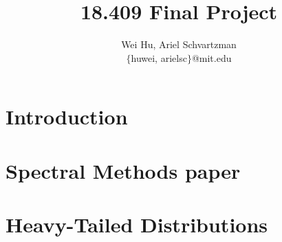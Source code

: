 \documentclass[10pt,letter]{article}
\begin{document}


\title{18.409 Final Project}

\author{Wei Hu, Ariel Schvartzman \\ $\{$huwei, arielsc$\}$@mit.edu} 
 
\maketitle 

\section{Introduction} 
\section{Spectral Methods paper}
\section{Heavy-Tailed Distributions}
 
\end{document}
